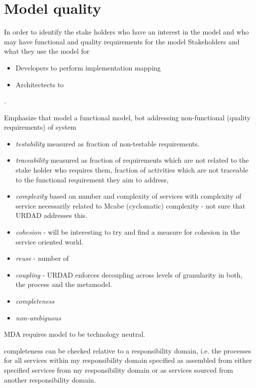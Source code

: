 \section{Model quality}


In order to identify the stake holders who have an interest in the model and who may have functional and quality requirements for the model
Stakeholders and what they use the model for
\begin{itemize}
  \item Developers to perform implementation mapping
  \item Architectects to 
\end{itemize}


\cite{lange_managing_2005,lange_improving_2006}.


Emphasize that model a functional model, bot addressing non-functional (quality requirements) of system

\begin{itemize}
  \item \emph{testability} measured as fraction of non-testable requirements.
  \item \emph{traceability} measured as fraction of requirements which are not related to the stake holder who requires them, fraction of activities which are not traceable to the functional requirement they aim to address, 
  \item \emph{complexity} based on number and complexity of services with complexity of service necessarily related to Mcabe (cyclomatic) complexity - not sure that URDAD addresses this.
  \item \emph{cohesion} - will be interesting to try and find a measure for cohesion in the service oriented world.
  \item \emph{reuse} - number of
  \item \emph{coupling} - URDAD enforces decoupling across levels of granularity in both, the process and the metamodel.
  \item \emph{completeness}
  \item \emph{non-ambiguous}
\end{itemize}


MDA requires model to be technology neutral.

completeness can be checked relative to a responsibility domain, i.e. the processes for all services within my responsibility domain specified as assembled from either specified services from my responsibility domain or as services sourced from another responsibility domain.


